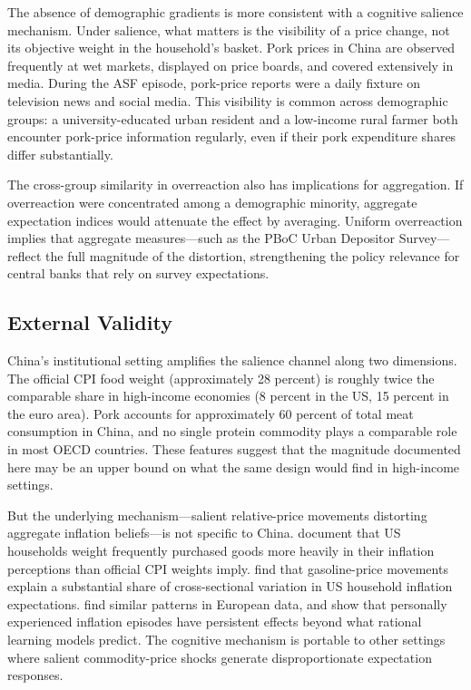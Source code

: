 The absence of demographic gradients is more consistent with
a cognitive salience mechanism.
Under salience, what matters is the visibility of a price
change, not its objective weight in the household's basket.
Pork prices in China are observed frequently at wet markets,
displayed on price boards, and covered extensively in media.
During the ASF episode, pork-price reports were a daily fixture
on television news and social media.
This visibility is common across demographic groups: a
university-educated urban resident and a low-income rural
farmer both encounter pork-price information regularly,
even if their pork expenditure shares differ substantially.

The cross-group similarity in overreaction also has
implications for aggregation.
If overreaction were concentrated among a demographic
minority, aggregate expectation indices would attenuate the
effect by averaging.
Uniform overreaction implies that aggregate measures---such
as the PBoC Urban Depositor Survey---reflect the full
magnitude of the distortion, strengthening the policy
relevance for central banks that rely on survey expectations.

\subsection{External Validity}\label{sec:external}

China's institutional setting amplifies the salience channel
along two dimensions.
The official CPI food weight (approximately 28 percent)
is roughly twice the comparable share in high-income economies
(8 percent in the US, 15 percent in the euro area).
Pork accounts for approximately 60 percent of total
meat consumption in China, and no single protein commodity plays
a comparable role in most OECD countries.
These features suggest that the magnitude documented here may
be an upper bound on what the same design would find in
high-income settings.

But the underlying mechanism---salient relative-price movements
distorting aggregate inflation beliefs---is not specific to China.
\citet{Cavallo2017} document that US households weight
frequently purchased goods more heavily in their inflation
perceptions than official CPI weights imply.
\citet{Coibion2015} find that gasoline-price movements
explain a substantial share of cross-sectional variation
in US household inflation expectations.
\citet{DacuntoHoangPirolliWeber2021} find similar patterns
in European data, and \citet{Malmendier2016} show that
personally experienced inflation episodes have persistent
effects beyond what rational learning models predict.
The cognitive mechanism is portable to other settings where
salient commodity-price shocks generate disproportionate
expectation responses.

